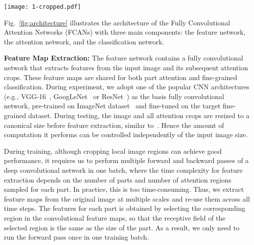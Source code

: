 \documentclass[10pt,twocolumn,letterpaper]{article}
\begin{document}
\begin{figure*}[t]
\begin{center}
\texttt{[image: 1-cropped.pdf]}
\end{center}
\caption{The architecture of our FCANs framework.
In this example, the attention network finds two parts of different sizes (the blue region and the yellow region).
The upper part shows the architecture for testing, and the lower part shows the architecture for training.
During testing, we crop all corresponding part patches from the high resolution image for classification.
During training, we re-use the convolutional features in the attention networks for classification.
Note that during testing, we can compute all part attentions simultaneously, which makes the model computationally more efficient than traditional recurrent attention models.
}
\label{fig:architecture}
\vspace{-8pt}
\end{figure*}

Fig.~\ref{fig:architecture} illustrates the architecture of the Fully Convolutional Attention Networks (FCANs) with three main components: the feature network, the attention network, and the classification network.

\textbf{Feature Map Extraction:}
The feature network contains a fully convolutional network that extracts features from the input image and its subsequent attention crops.
These feature maps are shared for both part attention and fine-grained classification.
During experiment, we adopt one of the popular CNN architectures (e.g., VGG-16~\cite{simonyan2014very}, GoogLeNet~\cite{szegedy2015going} or ResNet~\cite{he2016deep}) as the basis fully convolutional network, pre-trained on ImageNet dataset~\cite{wang2014object} and fine-tuned on the target fine-grained dataset.
During testing, the image and all attention crops are resized to a canonical size before feature extraction, similar to~\cite{mnih2014recurrent}.
Hence the amount of computation it performs can be controlled independently of the input image size.

During training, although cropping local image regions can achieve good performance, it requires us to perform multiple forward and backward passes of a deep convolutional network in one batch, where the time complexity for feature extraction depends on the number of parts and number of attention regions sampled for each part.
In practice, this is too time-consuming.
Thus, we extract feature maps from the original image at multiple scales and re-use them across all time steps.
The features for each part is obtained by selecting the corresponding region in the convolutional feature maps, so that the receptive field of the selected region is the same as the size of the part.
As a result, we only need to run the forward pass once in one training batch.
\end{document}
